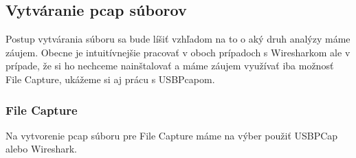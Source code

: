\newpage
\hfill \break

\subsection{Vytváranie pcap súborov}
Postup vytvárania súboru sa bude líšiť vzhľadom na to o aký druh analýzy máme záujem. Obecne je intuitívnejšie pracovať v oboch prípadoch s Wiresharkom ale v prípade, že si ho nechceme nainštalovať a máme záujem využívať iba možnosť File Capture, ukážeme si aj prácu s USBPcapom.

\subsubsection{File Capture}
Na vytvorenie pcap súboru pre File Capture máme na výber použiť USBPCap alebo Wireshark.

